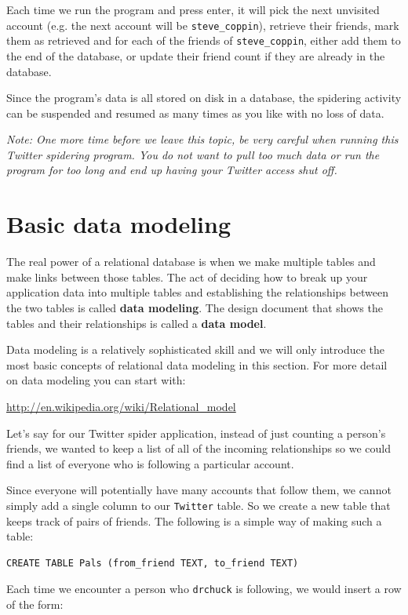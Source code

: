 \documentclass[11pt]{book}
\begin{document}
Each time we run the program and press enter, it will pick the next 
unvisited account (e.g. the next account will be \verb"steve_coppin"),
retrieve their friends, mark them as retrieved and for each of the 
friends of \verb"steve_coppin", either add them to the end of the 
database, or update their friend count if they are already in the
database.

Since the program's data is all stored on disk in a database, 
the spidering activity can be suspended and resumed as many times as you 
like with no loss of data.

\emph{Note: One more time before we leave this topic, 
be very careful when running this Twitter spidering program.  
You do not want to pull too much data or run the program for 
too long and end up having your Twitter access shut off.}

\section{Basic data modeling}

The real power of a relational database is when we make multiple tables
and make links between those tables.   The act of deciding how to break
up your application data into multiple tables and establishing the
relationships between the two tables is called {\bf data modeling}.  The
design document that shows the tables and their relationships 
is called a {\bf data model}.

Data modeling is a relatively sophisticated skill and we will only introduce
the most basic concepts of relational data modeling in this section.  For more
detail on data modeling you can start with:

\url{http://en.wikipedia.org/wiki/Relational_model}

Let's say for our Twitter spider application, instead of just 
counting a person's friends, we wanted to keep a list of 
all of the incoming relationships so we could find a list of 
everyone who is following a particular account.

Since everyone will potentially have many accounts that follow
them, we cannot simply add a single column to our {\tt Twitter} table. 
So we create a new table that keeps track of pairs of friends.
The following is a simple way of making such a table:

\beforeverb
\begin{verbatim}
CREATE TABLE Pals (from_friend TEXT, to_friend TEXT)
\end{verbatim}
\afterverb
%
Each time we encounter a person who {\tt drchuck} is following, we
would insert a row of the form:
\end{document}
